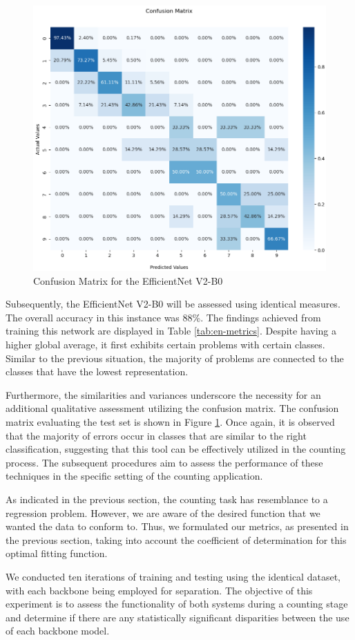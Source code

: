 \begin{figure}[h!]
    \centering
    \includegraphics[width = .7\linewidth]{Figures/cm-en.png}
    \caption{Confusion Matrix for the EfficientNet V2-B0}
    \label{fig:cm-en}
\end{figure}

Subsequently, the EfficientNet V2-B0 will be assessed using identical measures. The overall accuracy in this instance was 88\%. The findings achieved from training this network are displayed in Table \ref{tab:en-metrics}. Despite having a higher global average, it first exhibits certain problems with certain classes. Similar to the previous situation, the majority of problems are connected to the classes that have the lowest representation.

Furthermore, the similarities and variances underscore the necessity for an additional qualitative assessment utilizing the confusion matrix. The confusion matrix evaluating the test set is shown in Figure \ref{fig:cm-en}. Once again, it is observed that the majority of errors occur in classes that are similar to the right classification, suggesting that this tool can be effectively utilized in the counting process. The subsequent procedures aim to assess the performance of these techniques in the specific setting of the counting application. 

As indicated in the previous section, the counting task has resemblance to a regression problem. However, we are aware of the desired function that we wanted the data to conform to. Thus, we formulated our metrics, as presented in the previous section, taking into account the coefficient of determination for this optimal fitting function.

We conducted ten iterations of training and testing using the identical dataset, with each backbone being employed for separation. The objective of this experiment is to assess the functionality of both systems during a counting stage and determine if there are any statistically significant disparities between the use of each backbone model. 

